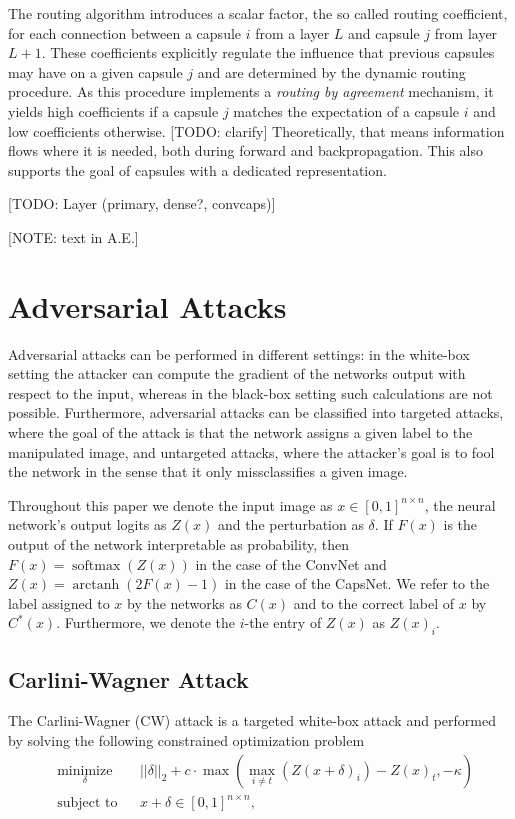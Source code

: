\documentclass{article}
\DeclareMathOperator\arctanh{arctanh}
\DeclareMathOperator\softmax{softmax}
\begin{document}
The routing algorithm introduces a scalar factor, the so called routing coefficient, for each connection between a capsule $i$ from a layer $L$ and capsule $j$ from layer $L+1$. These coefficients explicitly regulate the influence that previous capsules may have on a given capsule $j$ and are determined by the dynamic routing procedure. As this procedure implements a \textit{routing by agreement} mechanism, it yields high coefficients if a capsule $j$ matches the expectation of a capsule $i$ and low coefficients otherwise. [TODO: clarify] Theoretically, that means information flows where it is needed, both during forward and backpropagation. This also supports the goal of capsules with a dedicated representation.

[TODO: Layer (primary, dense?, convcaps)]

[NOTE: text in A.E.]



\section{Adversarial Attacks}
\label{lab:attacks}

Adversarial attacks can be performed in different settings: in the white-box setting the attacker can compute the gradient of the networks output with respect to the input, whereas in the black-box setting such calculations are not possible. Furthermore, adversarial attacks can be classified into targeted attacks, where the goal of the attack is that the network assigns a given label to the manipulated image, and untargeted attacks, where the attacker's goal is to fool the network in the sense that it only missclassifies a given image.

Throughout this paper we denote the input image as $x\in [0,1]^{n\times n}$, the neural network's output logits as $Z(x)$ and the perturbation as $\delta$. If $F(x)$ is the output of the network interpretable as probability, then
$F(x) = \softmax (Z(x))$ in the case of the ConvNet and $Z(x) = \arctanh(2F(x) - 1)$ in the case of the CapsNet. We refer to the label assigned to $x$ by the networks as $C(x)$  and to the correct label of $x$ by $C^*(x)$. Furthermore, we denote the $i$-the entry of $Z(x)$ as $Z(x)_i$.

\subsection{Carlini-Wagner Attack}

The Carlini-Wagner (CW) attack \cite{carlini} is a targeted white-box attack and performed by solving the following constrained optimization problem
\begin{equation}
	\begin{aligned}
	& \underset{\delta}{\text{minimize}}
	& & ||\delta||_2 + c \cdot \max(\max_{i\neq t}(Z(x+\delta)_i)-Z(x)_t, -\kappa) \\
	& \text{subject to}
	& & x+\delta \in [0,1]^{n \times n},
	\end{aligned}
\end{equation}
\end{document}
